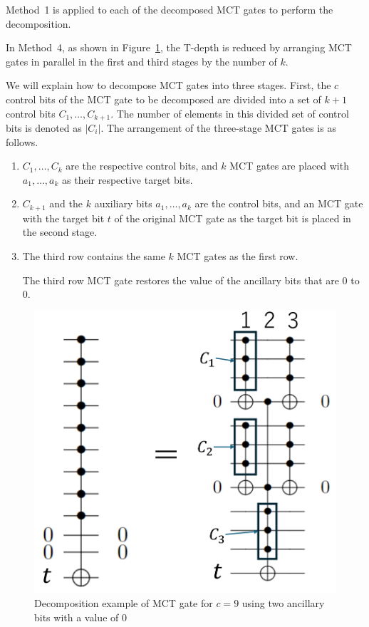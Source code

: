 Method~1 is applied to each of the decomposed MCT gates to perform the decomposition.

In Method~4, as shown in Figure~\ref{niemann},
the T-depth is reduced by arranging MCT gates in parallel in the first and third stages by the number of $k$.

\par
We will explain how to decompose MCT gates into three stages.
First, the $c$ control bits of the MCT gate to be decomposed are divided into a set of $k+1$ control bits $C_{1},\dots,C_{k+1}$.
The number of elements in this divided set of control bits is denoted as $|C_{i}|$.
The arrangement of the three-stage MCT gates is as follows.
\begin{enumerate}
\item $C_{1},\dots,C_{k}$ are the respective control bits, and $k$ MCT gates are placed with $a_{1},\dots,a_{k}$ as their respective target bits.
\item $C_{k+1}$ and the $k$ auxiliary bits $a_{1},\dots,a_{k}$ are the control bits, and an MCT gate with the target bit $t$ of the original MCT gate as the target bit is placed in the second stage.
\item The third row contains the same $k$ MCT gates as the first row.

The third row MCT gate restores the value of the ancillary bits that are 0 to 0.

\end{enumerate}
\begin{figure}[tbp]

\centering

\includegraphics[width=0.95\linewidth]{img/niemann.pdf}

\caption{Decomposition example of MCT gate for $c=9$ using two ancillary bits with a value of 0}

\label{niemann}

\end{figure}

